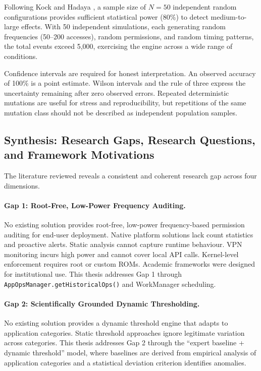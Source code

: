 Following Kock and Hadaya \cite{47}, a sample size of \(N=50\) independent random configurations provides sufficient statistical power (80\%) to detect medium-to-large effects. With 50 independent simulations, each generating random frequencies (50--200 accesses), random permissions, and random timing patterns, the total events exceed 5,000, exercising the engine across a wide range of conditions.

Confidence intervals are required for honest interpretation. An observed accuracy of 100\% is a point estimate. Wilson intervals and the rule of three express the uncertainty remaining after zero observed errors. Repeated deterministic mutations are useful for stress and reproducibility, but repetitions of the same mutation class should not be described as independent population samples.

\subsection{Synthesis: Research Gaps, Research Questions, and Framework Motivations}

The literature reviewed reveals a consistent and coherent research gap across four dimensions.

\paragraph{Gap 1: Root-Free, Low-Power Frequency Auditing.} No existing solution provides root-free, low-power frequency-based permission auditing for end-user deployment. Native platform solutions lack count statistics and proactive alerts. Static analysis cannot capture runtime behaviour. VPN monitoring incurs high power and cannot cover local API calls. Kernel-level enforcement requires root or custom ROMs. Academic frameworks were designed for institutional use. This thesis addresses Gap 1 through \texttt{AppOpsManager.getHistoricalOps()} and WorkManager scheduling.

\paragraph{Gap 2: Scientifically Grounded Dynamic Thresholding.} No existing solution provides a dynamic threshold engine that adapts to application categories. Static threshold approaches ignore legitimate variation across categories. This thesis addresses Gap 2 through the ``expert baseline + dynamic threshold'' model, where baselines are derived from empirical analysis of application categories and a statistical deviation criterion identifies anomalies.


